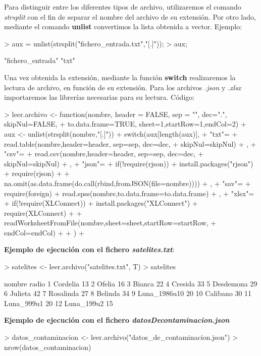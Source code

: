 \documentclass [a4paper] {article}
\begin{document}
Para distinguir entre los diferentes tipos de archivo, utilizaremos el comando \textit{strsplit} con el fin de 
separar el nombre del archivo de su extensión. Por otro lado, mediante el comando \textbf{unlist} convertimos la lista obtenida a vector.
Ejemplo:
\begin{Schunk}
\begin{Sinput}
> aux = unlist(strsplit("fichero_entrada.txt","[.]"));
> aux;
\end{Sinput}
\begin{Soutput}
[1] "fichero_entrada" "txt"            
\end{Soutput}
\end{Schunk}

Una vez obtenida la extensión, mediante la función \textbf{switch} realizaremos la lectura de archivo, en función de su extensión. 
Para los archivos \textit{.json} y \textit{.xlsx} importaremos las librerías necesarias para su lectura.
\newpage
Código:
\begin{Schunk}
\begin{Sinput}
> leer.archivo <- function(nombre, header = FALSE, sep = "", dec=".", skipNul=FALSE, 
+ 				to.data.frame=TRUE, sheet=1,startRow=1,endCol=2){
+ 	aux <- unlist(strsplit(nombre,"[.]"))
+ 	switch(aux[length(aux)],
+ 		"txt"={
+ 			read.table(nombre,header=header, sep=sep, dec=dec, 
+ 			skipNul=skipNul)
+ 		},
+ 		"csv"={
+ 			read.csv(nombre,header=header, sep=sep, dec=dec, 
+ 			skipNul=skipNul)
+ 		},
+ 		"json"={
+ 			if(!require(rjson)){
+ 				install.packages("rjson")
+ 				require(rjson)
+ 			}
+ 			na.omit(as.data.frame(do.call(rbind,fromJSON(file=nombre))))
+ 		},
+ 		"sav"={
+ 			require(foreign)
+ 			read.spss(nombre,to.data.frame=to.data.frame)
+ 		},
+ 		"xlsx"={
+ 			if(!require(XLConnect)){
+ 				install.packages("XLConnect")
+ 				require(XLConnect)
+ 			}
+ 			readWorksheetFromFile(nombre,sheet=sheet,startRow=startRow,
+ 			endCol=endCol)
+ 		}
+ 	)
+ }
\end{Sinput}
\end{Schunk}
\newpage
\hfil \textbf{Ejemplo de ejecución con el fichero \textit{satelites.txt}}: \par
\begin{Schunk}
\begin{Sinput}
> satelites <- leer.archivo("satelites.txt", T)
> satelites
\end{Sinput}
\begin{Soutput}
         nombre radio
1      Cordelia    13
2        Ofelia    16
3        Bianca    22
4       Cresida    33
5     Desdemona    29
6       Julieta    42
7     Rosalinda    27
8       Belinda    34
9  Luna_1986u10    20
10     Calibano    30
11   Luna_999u1    20
12   Luna_199u2    15
\end{Soutput}
\end{Schunk}
\hfil \textbf{Ejemplo de ejecución con el fichero \textit{datosDecontaminacion.json}} \par
\begin{Schunk}
\begin{Sinput}
> datos_contaminacion <- leer.archivo("datos_de_contaminacion.json")
> nrow(datos_contaminacion)
\end{Sinput}
\end{Schunk}
\end{document}

